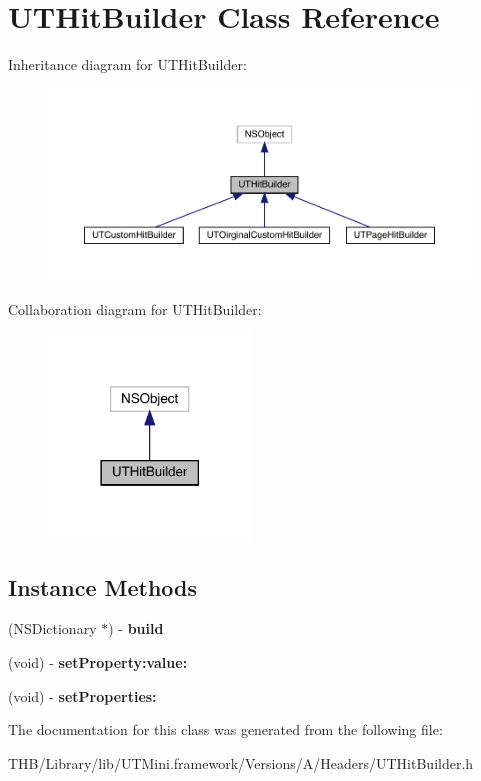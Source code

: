 \hypertarget{interface_u_t_hit_builder}{}\section{U\+T\+Hit\+Builder Class Reference}
\label{interface_u_t_hit_builder}


Inheritance diagram for U\+T\+Hit\+Builder\+:\nopagebreak
\begin{figure}[H]
\begin{center}
\leavevmode
\includegraphics[width=350pt]{interface_u_t_hit_builder__inherit__graph}
\end{center}
\end{figure}


Collaboration diagram for U\+T\+Hit\+Builder\+:\nopagebreak
\begin{figure}[H]
\begin{center}
\leavevmode
\includegraphics[width=153pt]{interface_u_t_hit_builder__coll__graph}
\end{center}
\end{figure}
\subsection*{Instance Methods}
\begin{DoxyCompactItemize}
\item 
\mbox{\label{interface_u_t_hit_builder_a3bd1061e6b4add03b7f09e44ce80b41b}} 
(N\+S\+Dictionary $\ast$) -\/ {\bfseries build}
\item 
\mbox{\label{interface_u_t_hit_builder_a54a4b30092e119b91ffc5ce09674c9b8}} 
(void) -\/ {\bfseries set\+Property\+:value\+:}
\item 
\mbox{\label{interface_u_t_hit_builder_a5d285fc2c255208f8405a8d12d32b14a}} 
(void) -\/ {\bfseries set\+Properties\+:}
\end{DoxyCompactItemize}


The documentation for this class was generated from the following file\+:\begin{DoxyCompactItemize}
\item 
T\+H\+B/\+Library/lib/\+U\+T\+Mini.\+framework/\+Versions/\+A/\+Headers/U\+T\+Hit\+Builder.\+h\end{DoxyCompactItemize}
